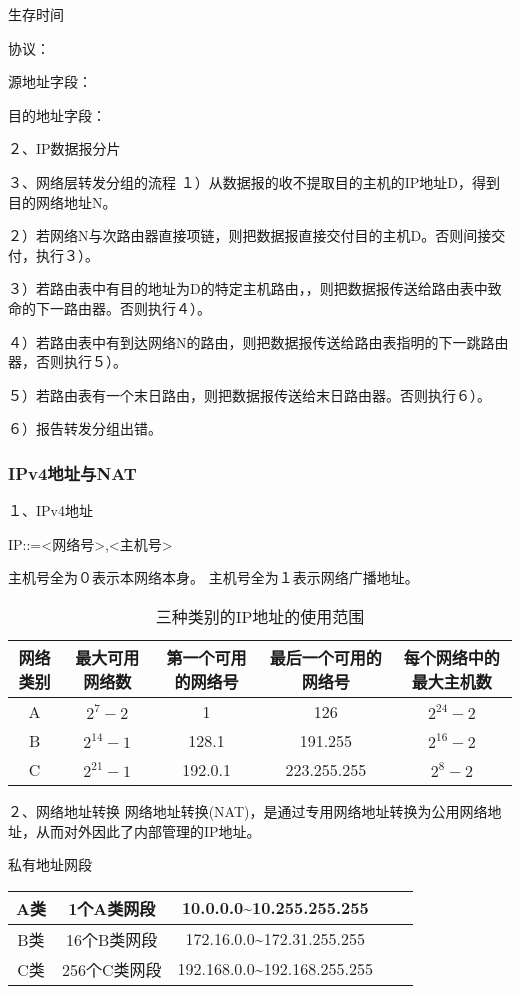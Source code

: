 \documentclass{ctexart}
\begin{document}
生存时间

协议：

源地址字段：

目的地址字段：

２、IP数据报分片

３、网络层转发分组的流程
１）从数据报的收不提取目的主机的IP地址D，得到目的网络地址N。

２）若网络N与次路由器直接项链，则把数据报直接交付目的主机D。否则间接交付，执行３）。

３）若路由表中有目的地址为D的特定主机路由，，则把数据报传送给路由表中致命的下一路由器。否则执行４）。

４）若路由表中有到达网络N的路由，则把数据报传送给路由表指明的下一跳路由器，否则执行５）。

５）若路由表有一个末日路由，则把数据报传送给末日路由器。否则执行６）。

６）报告转发分组出错。

\subsubsection{IPv4地址与NAT}
１、IPv4地址

IP::={<网络号>,<主机号>}

主机号全为０表示本网络本身。
主机号全为１表示网络广播地址。

\begin{table}[!hbp]
\caption{三种类别的IP地址的使用范围}
\begin{tabular}{|c|c|c|c|c|}
\hline
网络类别 & 最大可用网络数& 第一个可用的网络号 & 最后一个可用的网络号 & 每个网络中的最大主机数 \\
\hline
A & $2^7-2$ & 1 & 126 & $2^{24}-2$ \\
\hline
B&$2^{14}-1$&128.1&191.255&$2^{16}-2$\\
\hline
C&$2^{21}-1$&192.0.1&223.255.255&$2^8-2$\\
\hline
\end{tabular}
\end{table} 

２、网络地址转换
网络地址转换(NAT)，是通过专用网络地址转换为公用网络地址，从而对外因此了内部管理的IP地址。

私有地址网段
\begin{table}[!hbp]
\begin{tabular}{|c|c|c|c|c|}
\hline
A类 & 1个A类网段 & 10.0.0.0\~{}10.255.255.255 \\
\hline
B类 & 16个B类网段 & 172.16.0.0\~{}172.31.255.255 \\
\hline
C类 & 256个C类网段 & 192.168.0.0\~{}192.168.255.255 \\
\hline
\end{tabular}
\end{table} 
\end{document}
